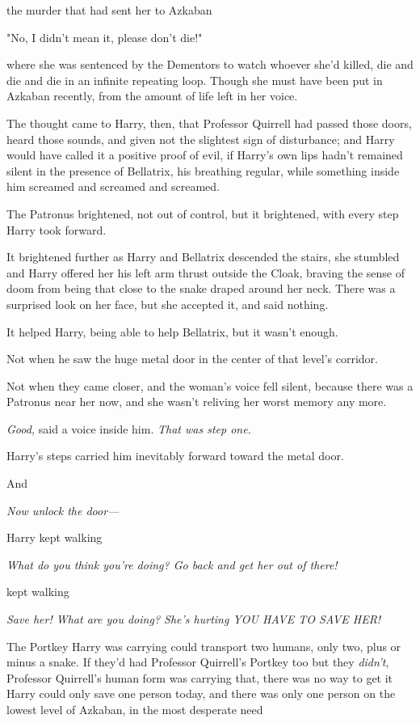 {\el} the murder that had sent her to Azkaban{\el}

"No, I didn't mean it, please don't die!"

{\el} where she was sentenced by the Dementors to watch whoever she'd killed,
die and die and die in an infinite repeating loop. Though she must have been
put in Azkaban recently, from the amount of life left in her voice.

The thought came to Harry, then, that Professor Quirrell had passed those
doors, heard those sounds, and given not the slightest sign of disturbance; and
Harry would have called it a positive proof of evil, if Harry's own lips hadn't
remained silent in the presence of Bellatrix, his breathing regular, while
something inside him screamed and screamed and screamed.

The Patronus brightened, not out of control, but it brightened, with every step
Harry took forward.

It brightened further as Harry and Bellatrix descended the stairs, she stumbled
and Harry offered her his left arm thrust outside the Cloak, braving the sense
of doom from being that close to the snake draped around her neck. There was a
surprised look on her face, but she accepted it, and said nothing.

It helped Harry, being able to help Bellatrix, but it wasn't enough.

Not when he saw the huge metal door in the center of that level's corridor.

Not when they came closer, and the woman's voice fell silent, because there was
a Patronus near her now, and she wasn't reliving her worst memory any more.

\emph{Good,} said a voice inside him. \emph{That was step one.}

Harry's steps carried him inevitably forward toward the metal door.

And{\el}

\emph{Now unlock the door---}

{\el} Harry kept walking{\el}

\emph{What do you think you're doing? Go back and get her out of there!}

{\el} kept walking{\el}

\emph{Save her! What are you doing? She's hurting YOU HAVE TO SAVE HER!}

The Portkey Harry was carrying could transport two humans, only two, plus or
minus a snake. If they'd had Professor Quirrell's Portkey too{\el} but they
\emph{didn't}, Professor Quirrell's human form was carrying that, there was no
way to get it{\el} Harry could only save one person today, and there was
only one person on the lowest level of Azkaban, in the most desperate
need{\el}

